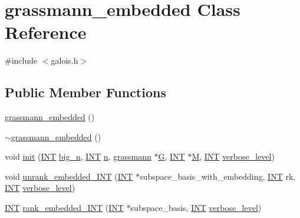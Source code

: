 \hypertarget{classgrassmann__embedded}{}\section{grassmann\+\_\+embedded Class Reference}
\label{classgrassmann__embedded}


{\ttfamily \#include $<$galois.\+h$>$}

\subsection*{Public Member Functions}
\begin{DoxyCompactItemize}
\item 
\mbox{\hyperlink{classgrassmann__embedded_a480bffd75365db05623d252eb2e78544}{grassmann\+\_\+embedded}} ()
\item 
\mbox{\hyperlink{classgrassmann__embedded_a724c69423ffb0bef8d03a422807a84cc}{$\sim$grassmann\+\_\+embedded}} ()
\item 
void \mbox{\hyperlink{classgrassmann__embedded_a4cc2970a357bace5b18479def170019b}{init}} (\mbox{\hyperlink{galois_8h_a09fddde158a3a20bd2dcadb609de11dc}{I\+NT}} \mbox{\hyperlink{classgrassmann__embedded_aad39dd5ac4920ce008105a2261da36f4}{big\+\_\+n}}, \mbox{\hyperlink{galois_8h_a09fddde158a3a20bd2dcadb609de11dc}{I\+NT}} \mbox{\hyperlink{classgrassmann__embedded_ae1c6e1de2be244c0f3be3ee321ba67a1}{n}}, \mbox{\hyperlink{classgrassmann}{grassmann}} $\ast$\mbox{\hyperlink{classgrassmann__embedded_a33ae25817c1a5b00e23c84af8495bb1e}{G}}, \mbox{\hyperlink{galois_8h_a09fddde158a3a20bd2dcadb609de11dc}{I\+NT}} $\ast$\mbox{\hyperlink{classgrassmann__embedded_a9a105dbabb1733b0198734a91727e074}{M}}, \mbox{\hyperlink{galois_8h_a09fddde158a3a20bd2dcadb609de11dc}{I\+NT}} \mbox{\hyperlink{simeon_8_c_a818073fbcc2f439e7c56952f67386122}{verbose\+\_\+level}})
\item 
void \mbox{\hyperlink{classgrassmann__embedded_a373f89c0c8e95d6126c59cf62dc935c0}{unrank\+\_\+embedded\+\_\+\+I\+NT}} (\mbox{\hyperlink{galois_8h_a09fddde158a3a20bd2dcadb609de11dc}{I\+NT}} $\ast$subspace\+\_\+basis\+\_\+with\+\_\+embedding, \mbox{\hyperlink{galois_8h_a09fddde158a3a20bd2dcadb609de11dc}{I\+NT}} rk, \mbox{\hyperlink{galois_8h_a09fddde158a3a20bd2dcadb609de11dc}{I\+NT}} \mbox{\hyperlink{simeon_8_c_a818073fbcc2f439e7c56952f67386122}{verbose\+\_\+level}})
\item 
\mbox{\hyperlink{galois_8h_a09fddde158a3a20bd2dcadb609de11dc}{I\+NT}} \mbox{\hyperlink{classgrassmann__embedded_a3fa211e920ee8b5009c0b57943742995}{rank\+\_\+embedded\+\_\+\+I\+NT}} (\mbox{\hyperlink{galois_8h_a09fddde158a3a20bd2dcadb609de11dc}{I\+NT}} $\ast$subspace\+\_\+basis, \mbox{\hyperlink{galois_8h_a09fddde158a3a20bd2dcadb609de11dc}{I\+NT}} \mbox{\hyperlink{simeon_8_c_a818073fbcc2f439e7c56952f67386122}{verbose\+\_\+level}})

\end{DoxyCompactItemize}
